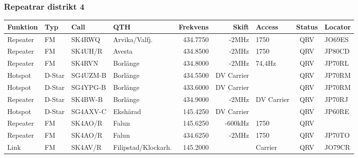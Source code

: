 \begin{landscape}
\subsubsection{Repeatrar distrikt 4}
\footnotesize
\begin{longtable}{llllrrlcl}
	\textbf{Funktion}         & \textbf{Typ}  & \textbf{Call} & \textbf{QTH}        & \textbf{Frekvens} & \textbf{Skift} & \textbf{Access}  & \textbf{Status} & \textbf{Locator} \\ \hline
	\endhead
	Repeater                  & FM            & SK4RWQ        & Arvika/Valfj.       & 434.7750          & -2MHz          & 1750             & QRV             & JO69ES           \\
	Repeater                  & FM            & SK4UH/R       & Avesta              & 434.8500          & -2MHz          & 1750             & QRV             & JP80CD           \\
	Repeater                  & FM            & SK4RVN        & Borlänge            & 434.8000          & -2MHz          & 74,4Hz           & QRV             & JP70RL           \\
	Hotspot                   & D-Star        & SG4UZM-B      & Borlänge            & 434.5500          & DV Carrier     &                  & QRV             & JP70RM           \\
	Hotspot                   & D-Star        & SG4YPG-B      & Borlänge            & 433.6000          & DV Carrier     &                  & QRV             & JP70RM           \\
	Repeater                  & D-Star        & SK4BW-B       & Borlänge            & 434.9000          & -2MHz          & DV Carrier       & QRV             & JP70RJ           \\
	Hotspot                   & D-Star        & SG4AXV-C      & Ekshärad            & 145.4250          & DV Carrier     &                  & QRV             & JP60RE           \\
	Repeater                  & FM            & SK4AO/R       & Falun               & 145.6250          & -600kHz        & 1750             & QRV             & \\
	Repeater                  & FM            & SK4AO/R       & Falun               & 434.6250          & -2MHz          & 1750             & QRV             & JP70TO           \\
	Link                      & FM            & SK4AV/R       & Filipstad/Klockarh. & 145.2000          &                & Carrier          & QRV             & JO79CR           \\

\end{longtable}
\end{landscape}
